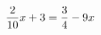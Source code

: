 \documentclass[preview]{standalone}
\begin{document}
\begin{align*}
\special{dvisvgm:raw <g id='unique000'>}\frac{2}{10}x + 3 = \frac{3}{4} - 9x\special{dvisvgm:raw </g>}
\end{align*}
\end{document}
